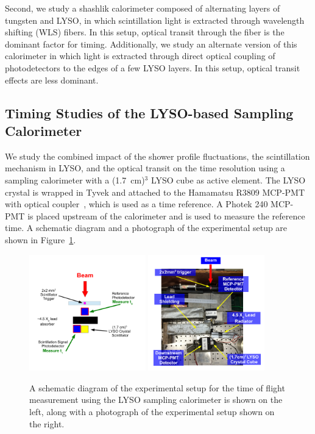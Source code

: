 \documentclass[12pt]{article}
\begin{document}
{Second, we study a shashlik calorimeter composed of alternating layers of
tungsten and LYSO, in which scintillation light is extracted through wavelength
shifting (WLS) fibers. In this setup, optical transit through the fiber is the
dominant factor for timing. Additionally, we study an alternate version of this
calorimeter in which light is extracted through direct optical coupling of
photodetectors to the edges of a few LYSO layers. In this setup, optical transit
effects are less dominant.



\subsection{Timing Studies of the LYSO-based Sampling Calorimeter}

We study the combined impact of the shower profile fluctuations, the
scintillation mechanism in LYSO, and the optical transit on the time resolution
using a sampling calorimeter with a (1.7~cm)$^{3}$ LYSO cube as active
element. The LYSO crystal is wrapped in Tyvek and attached to the Hamamatsu
R3809 MCP-PMT with optical coupler~\cite{grease}, which is used as a time reference. A Photek 240
MCP-PMT is placed upstream of the calorimeter and is used to measure the
reference time. A schematic diagram and a photograph of the experimental setup
are shown in Figure~\ref{fig:LYSOSamplingCaloSetup}. 

\begin{figure}[h] \centering
\includegraphics[width=0.45\textwidth]{figs/LYSOSamplingCaloSetupSchematic} 
\includegraphics[width=0.45\textwidth]{figs/LYSOSamplingCaloSetupPhoto} 
\caption{ A schematic diagram of the experimental setup for the
time of flight measurement using the LYSO sampling calorimeter is shown
on the left, along with a photograph of the experimental setup shown on the right. } 
\label{fig:LYSOSamplingCaloSetup}
\end{figure}

}
\end{document}
